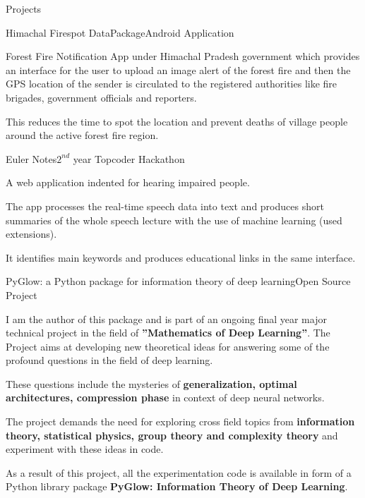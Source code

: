 \documentclass{resume} %
\begin{document}
\begin{rSection}{Projects}

\begin{rSubsection}{Himachal Firespot DataPackage}{Android Application}{}{}
    \item Forest Fire Notification App under Himachal Pradesh government which provides an interface for the user to upload an image alert of the forest fire and then the GPS location of the sender is circulated to the registered authorities like fire brigades, government officials and reporters. 
    \item This reduces the time to spot the location and prevent deaths of village people around the active forest fire region.
\end{rSubsection}

\begin{rSubsection}{Euler Notes}{$2^{nd}$ year Topcoder Hackathon}{}{}
\item A web application indented for hearing impaired people. 
\item The app processes the real-time speech data into text and produces short summaries of the whole speech lecture with the use of machine learning (used extensions). 
\item It identifies main keywords and produces educational links in the same interface.
\end{rSubsection}

\begin{rSubsection}{PyGlow: a Python package for information theory of deep learning}{Open Source Project}{}{}
\item I am the author of this package and is part of an ongoing final year major technical project in the field of \textbf{”Mathematics of Deep Learning”}. The Project aims at developing new theoretical ideas for answering some of the profound questions in the field of deep learning.
    \item These questions include the mysteries of \textbf{generalization, optimal architectures, compression phase} in context of deep neural networks.
    \item The project demands the need for exploring cross field topics from \textbf{information theory, statistical physics, group theory and complexity theory} and experiment with these ideas in code.
    \item As a result of this project, all the experimentation code is available in form of a Python library package \textbf{PyGlow: Information Theory of Deep Learning}.
\end{rSubsection}


\end{rSection}
\end{document}
